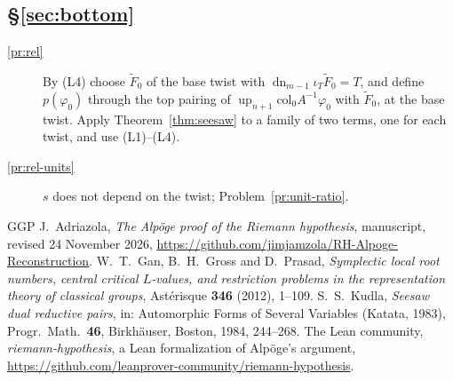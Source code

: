 \documentclass[reqno]{amsart}
\theoremstyle{definition}
\theoremstyle{plain}
\theoremstyle{remark}
\newcommand{\up}{\operatorname{up}}
\newcommand{\dn}{\operatorname{dn}}
\begin{document}
\subsection*{\S\ref{sec:bottom}}
\begin{description}
\item[\ref{pr:rel}] By (L4) choose \(\tilde F_0\) of the base twist with \(\dn_{m-1}\iota_T\tilde F_0=T\), and define \(p(\varphi_0)\) through the top pairing of \(\up_{n+1}\mathrm{col}_0A^{-1}\varphi_0\) with \(\tilde F_0\), at the base twist.  Apply Theorem~\ref{thm:seesaw} to a family of two terms, one for each twist, and use (L1)--(L4).
\item[\ref{pr:rel-units}] \(s\) does not depend on the twist; Problem~\ref{pr:unit-ratio}.
\end{description}

\begin{thebibliography}{GGP}
 J.~Adriazola, \emph{The Alp\"oge proof of the Riemann hypothesis}, manuscript, revised 24 November 2026, \url{https://github.com/jimjamzola/RH-Alpoge-Reconstruction}.
 W.~T.~Gan, B.~H.~Gross and D.~Prasad, \emph{Symplectic local root numbers, central critical \(L\)-values, and restriction problems in the representation theory of classical groups}, Ast\'erisque \textbf{346} (2012), 1--109.
 S.~S.~Kudla, \emph{Seesaw dual reductive pairs}, in: Automorphic Forms of Several Variables (Katata, 1983), Progr.\ Math.\ \textbf{46}, Birkh\"auser, Boston, 1984, 244--268.
 The Lean community, \emph{riemann-hypothesis}, a Lean formalization of Alp\"oge's argument, \url{https://github.com/leanprover-community/riemann-hypothesis}.
\end{thebibliography}
\end{document}

